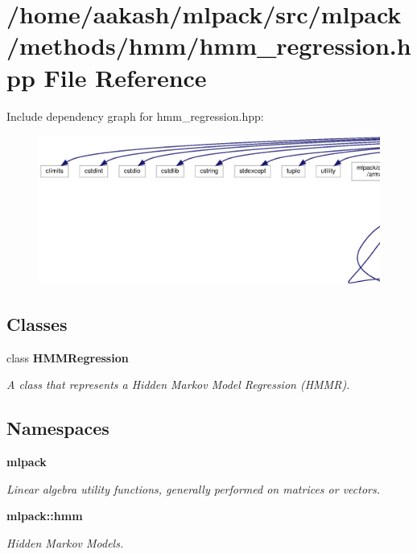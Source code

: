 \section{/home/aakash/mlpack/src/mlpack/methods/hmm/hmm\+\_\+regression.hpp File Reference}
\label{hmm__regression_8hpp}
Include dependency graph for hmm\+\_\+regression.\+hpp\+:
\nopagebreak
\begin{figure}[H]
\begin{center}
\leavevmode
\includegraphics[width=350pt]{hmm__regression_8hpp__incl}
\end{center}
\end{figure}
\subsection*{Classes}
\begin{DoxyCompactItemize}
\item 
class \textbf{ H\+M\+M\+Regression}
\begin{DoxyCompactList}\small\item\em A class that represents a Hidden Markov Model Regression (H\+M\+MR). \end{DoxyCompactList}\end{DoxyCompactItemize}
\subsection*{Namespaces}
\begin{DoxyCompactItemize}
\item 
 \textbf{ mlpack}
\begin{DoxyCompactList}\small\item\em Linear algebra utility functions, generally performed on matrices or vectors. \end{DoxyCompactList}\item 
 \textbf{ mlpack\+::hmm}
\begin{DoxyCompactList}\small\item\em Hidden Markov Models. \end{DoxyCompactList}\end{DoxyCompactItemize}


